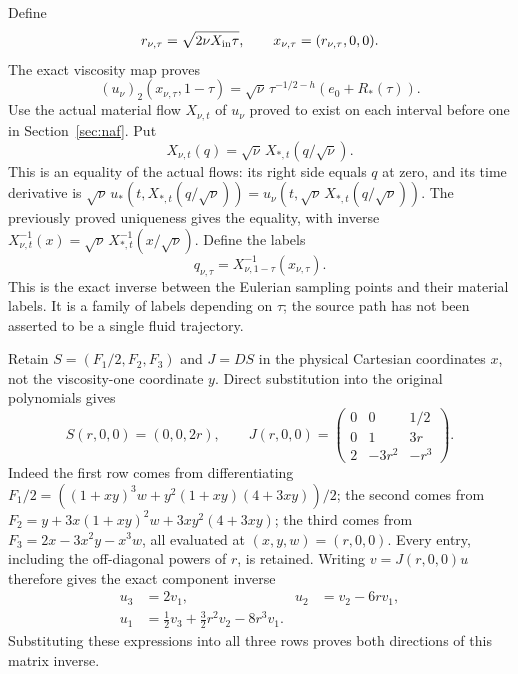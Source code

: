 Define
\[
 r_{\nu,\tau}=\sqrt{2\nu X_{\rm in}\tau},\qquad
 x_{\nu,\tau}=(r_{\nu,\tau},0,0).
\]
The exact viscosity map proves
\begin{equation}
 (u_\nu)_2(x_{\nu,\tau},1-\tau)
 =\sqrt\nu\,\tau^{-1/2-h}(e_0+R_*(\tau)).
 \label{nw:actualswirl}
\end{equation}
Use the actual material flow $X_{\nu,t}$ of $u_\nu$ proved to exist
on each interval before one in Section~\ref{sec:naf}. Put
\[
 X_{\nu,t}(q)=\sqrt\nu\,X_{*,t}(q/\sqrt\nu).
\]
This is an equality of the actual flows: its right side equals $q$ at
zero, and its time derivative is
$\sqrt\nu\,u_*(t,X_{*,t}(q/\sqrt\nu))
 =u_\nu(t,\sqrt\nu\,X_{*,t}(q/\sqrt\nu))$.
The previously proved uniqueness gives the equality, with inverse
$X_{\nu,t}^{-1}(x)=\sqrt\nu\,X_{*,t}^{-1}(x/\sqrt\nu)$.
Define the labels
\[
 q_{\nu,\tau}=X_{\nu,1-\tau}^{-1}(x_{\nu,\tau}).
\]
This is the exact inverse between the Eulerian sampling points and
their material labels. It is a family of labels depending on $\tau$;
the source path has not been asserted to be a single fluid trajectory.

Retain $S=(F_1/2,F_2,F_3)$ and $J=DS$ in the physical Cartesian
coordinates $x$, not the viscosity-one coordinate $y$. Direct
substitution into the original polynomials gives
\[
 S(r,0,0)=(0,0,2r),\qquad
 J(r,0,0)=\begin{pmatrix}
 0&0&1/2\\0&1&3r\\2&-3r^2&-r^3
 \end{pmatrix}.
\]
Indeed the first row comes from differentiating
$F_1/2=((1+xy)^3w+y^2(1+xy)(4+3xy))/2$;
the second comes from
$F_2=y+3x(1+xy)^2w+3xy^2(4+3xy)$; the third comes from
$F_3=2x-3x^2y-x^3w$, all evaluated at $(x,y,w)=(r,0,0)$.
Every entry, including the off-diagonal powers of $r$, is retained.
Writing $v=J(r,0,0)u$ therefore gives the exact component inverse
\begin{align*}
 u_3&=2v_1, &u_2&=v_2-6rv_1,\\
 u_1&=\tfrac12v_3+\tfrac32r^2v_2-8r^3v_1.
\end{align*}
Substituting these expressions into all three rows proves both
directions of this matrix inverse.

